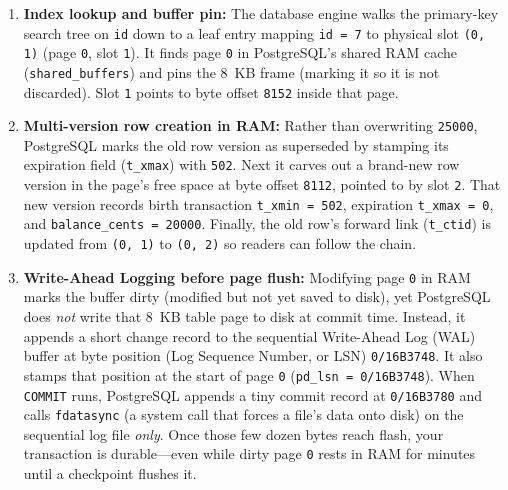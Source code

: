 \begin{enumerate}
  \item \textbf{Index lookup and buffer pin:} The database engine walks the primary-key search tree on \texttt{id} down to a leaf entry mapping \texttt{id = 7} to physical slot \texttt{(0, 1)} (page \texttt{0}, slot \texttt{1}). It finds page \texttt{0} in PostgreSQL's shared RAM cache (\texttt{shared\_buffers}) and pins the 8~KB frame (marking it so it is not discarded). Slot \texttt{1} points to byte offset \texttt{8152} inside that page.
  \item \textbf{Multi-version row creation in RAM:} Rather than overwriting \texttt{25000}, PostgreSQL marks the old row version as superseded by stamping its expiration field (\texttt{t\_xmax}) with \texttt{502}. Next it carves out a brand-new row version in the page's free space at byte offset \texttt{8112}, pointed to by slot \texttt{2}. That new version records birth transaction \texttt{t\_xmin = 502}, expiration \texttt{t\_xmax = 0}, and \texttt{balance\_cents = 20000}. Finally, the old row's forward link (\texttt{t\_ctid}) is updated from \texttt{(0, 1)} to \texttt{(0, 2)} so readers can follow the chain.
  \item \textbf{Write-Ahead Logging before page flush:} Modifying page \texttt{0} in RAM marks the buffer dirty (modified but not yet saved to disk), yet PostgreSQL does \emph{not} write that 8~KB table page to disk at commit time. Instead, it appends a short change record to the sequential Write-Ahead Log (WAL) buffer at byte position (Log Sequence Number, or LSN) \texttt{0/16B3748}. It also stamps that position at the start of page \texttt{0} (\texttt{pd\_lsn = 0/16B3748}). When \texttt{COMMIT} runs, PostgreSQL appends a tiny commit record at \texttt{0/16B3780} and calls \texttt{fdatasync} (a system call that forces a file's data onto disk) on the sequential log file \emph{only}. Once those few dozen bytes reach flash, your transaction is durable---even while dirty page \texttt{0} rests in RAM for minutes until a checkpoint flushes it.
\end{enumerate}

